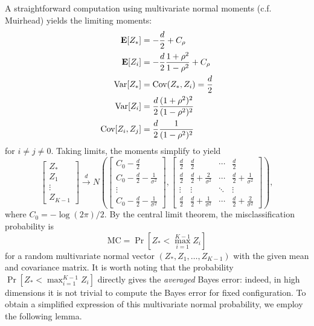\documentclass[12pt]{article}
\begin{document}
A straightforward computation using multivariate normal moments (c.f. Muirhead) yields the limiting moments:
\begin{align*}
\textbf{E}[Z_*] &= -\frac{d}{2} + C_\rho\\
\textbf{E}[Z_i] &= -\frac{d}{2}\frac{1 + \rho^2}{1-\rho^2} + C_\rho\\
\text{Var}[Z_*] &= \text{Cov}(Z_*, Z_i) = \frac{d}{2}\\
\text{Var}[Z_i] &= \frac{d}{2}\frac{(1 + \rho^2)^2}{(1-\rho^2)^2}\\
\text{Cov}[Z_i, Z_j] &= \frac{d}{2}\frac{1}{(1-\rho^2)^2}
\end{align*}
for $i \neq j \neq 0$.
Taking limits, the moments simplify to yield
\[
\begin{bmatrix}
Z_*\\
Z_1\\
\vdots\\
Z_{K-1}
\end{bmatrix} \stackrel{d}{\to} N\left(
\begin{bmatrix}
C_0-\frac{d}{2}\\
C_0-\frac{d}{2} - \frac{1}{\sigma^2}\\
\vdots\\
C_0-\frac{d}{2} - \frac{1}{\sigma^2}
\end{bmatrix},
\begin{bmatrix}
\frac{d}{2} & \frac{d}{2} & \cdots & \frac{d}{2}\\
\frac{d}{2} & \frac{d}{2} + \frac{2}{\sigma^2} & \cdots & \frac{d}{2} + \frac{1}{\sigma^2}\\
\vdots & \vdots & \ddots & \vdots\\
\frac{d}{2} & \frac{d}{2} + \frac{1}{\sigma^2} & \cdots & \frac{d}{2} + \frac{2}{\sigma^2}
\end{bmatrix}
\right),
\]
where $C_0 = -\log(2\pi)/2$.
By the central limit theorem, the misclassification probability is
\[
\text{MC} = \Pr[Z_* < \max_{i=1}^{K-1} Z_i]
\]
for a random multivariate normal vector $(Z_*, Z_1, \hdots, Z_{K-1})$
with the given mean and covariance matrix.  It is worth noting that
the probability $\Pr[Z_* < \max_{i=1}^{K-1} Z_i]$ directly gives
the \emph{averaged} Bayes error: indeed, in high dimensions it is not
trivial to compute the Bayes error for fixed configuration.
To obtain a simplified expression of this multivariate normal
probability, we employ the following lemma.
\end{document}

